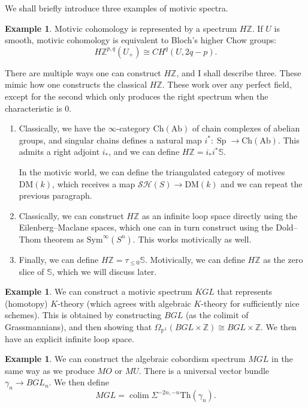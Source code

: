 \documentclass{shortart}
\theoremstyle{definition}
\newtheorem{eg}[thm]{Example}
\newcommand\Th{\mathrm{Th}}
\newcommand\SH{\mathcal{SH}}
\renewcommand\P{\mathbb{P}}
\newcommand\Ch{\mathrm{Ch}}
\newcommand\Ab{\mathrm{Ab}}
\newcommand\DM{\mathrm{DM}}
\newcommand\Z{\mathbb{Z}}
\renewcommand\S{\mathbb{S}}
\DeclareMathOperator\Sp{Sp}
\DeclareMathOperator*\colim{colim}
\begin{document}
We shall briefly introduce three examples of motivic spectra.
\begin{eg}
  Motivic cohomology is represented by a spectrum $H\Z$. If $U$ is smooth, motivic cohomology is equivalent to Bloch's higher Chow groups:
  \[
    H\Z^{p, q}(U_+) \cong CH^q(U, 2q - p).
  \]

  There are multiple ways one can construct $H\Z$, and I shall describe three. These mimic how one constructs the classical $H\Z$. These work over any perfect field, except for the second which only produces the right spectrum when the characteristic is $0$.

  \begin{enumerate}
    \item Classically, we have the $\infty$-category $\Ch(\Ab)$ of chain complexes of abelian groups, and singular chains defines a natural map $i^*: \Sp \to \Ch(\Ab)$. This admits a right adjoint $i_*$, and we can define $H\Z = i_* i^* \S$.

      In the motivic world, we can define the triangulated category of motives $\DM(k)$, which receives a map $\SH(S) \to \DM(k)$ and we can repeat the previous paragraph.

    \item Classically, we can construct $H\Z$ as an infinite loop space directly using the Eilenberg--Maclane spaces, which one can in turn construct using the Dold--Thom theorem as $\mathrm{Sym}^\infty(S^n)$. This works motivically as well.

    \item Finally, we can define $H\Z = \tau_{\leq 0} \S$. Motivically, we can define $H\Z$ as the zero slice of $\S$, which we will discuss later.
  \end{enumerate}
\end{eg}

\begin{eg}
  We can construct a motivic spectrum $KGL$ that represents (homotopy) $K$-theory (which agrees with algebraic $K$-theory for sufficiently nice schemes). This is obtained by constructing $BGL$ (as the colimit of Grassmannians), and then showing that $\Omega_{\P^1} (BGL \times \Z) \cong BGL \times \Z$. We then have an explicit infinite loop space.
\end{eg}

\begin{eg}
  We can construct the algebraic cobordism spectrum $MGL$ in the same way as we produce $MO$ or $MU$. There is a universal vector bundle $\gamma_n \to BGL_n$. We then define
  \[
    MGL = \colim \Sigma^{-2n, -n} \Th(\gamma_n).
  \]
\end{eg}
\end{document}
